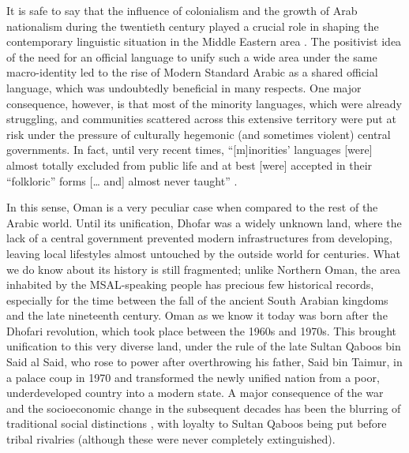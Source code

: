 \documentclass[output=paper]{langscibook}
\begin{document}
It is safe to say that the influence of colonialism and the growth of Arab nationalism during the twentieth century played a crucial role in shaping the contemporary linguistic situation in the Middle Eastern area \citep{khalidi_origins_1991}. The positivist idea of the need for an official language to unify such a wide area under the same macro-identity led to the rise of Modern Standard Arabic as a shared official language, which was undoubtedly beneficial in many respects. One major consequence, however, is that most of the minority languages, which were already struggling, and communities scattered across this extensive territory were put at risk under the pressure of culturally hegemonic (and sometimes violent) central governments. In fact, until very recent times, “[m]inorities’ languages [were] almost totally excluded from public life and at best [were] accepted in their ``folkloric'' forms [… and] almost never taught” \citep[8]{miller_linguistic_2003}.

In this sense, Oman is a very peculiar case when compared to the rest of the Arabic world. Until its unification, Dhofar was a widely unknown land, where the lack of a central government prevented modern infrastructures from developing, leaving local lifestyles almost untouched by the outside world for centuries. What we do know about its history is still fragmented; unlike Northern Oman, the area inhabited by the MSAL-speaking people has precious few historical records, especially for the time between the fall of the ancient South Arabian kingdoms and the late nineteenth century. Oman as we know it today was born after the Dhofari revolution, which took place between the 1960s and 1970s. This brought unification to this very diverse land, under the rule of the late Sultan Qaboos bin Said al Said, who rose to power after overthrowing his father, Said bin Taimur, in a palace coup in 1970 and transformed the newly unified nation from a poor, underdeveloped country into a modern state. A major consequence of the war and the socioeconomic change in the subsequent decades has been the blurring of traditional social distinctions \citep[266]{peterson_omans_2004}, with loyalty to Sultan Qaboos being put before tribal rivalries (although these were never completely extinguished). 
\end{document}
